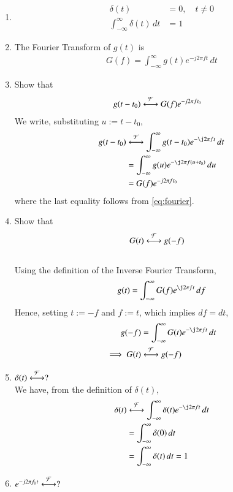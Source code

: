 \documentclass[journal,12pt,twocolumn]{IEEEtran}
\renewcommand\thesection{\arabic{section}}
\begin{document}
\begin{enumerate}[label=\thesection.\arabic*
,ref=\thesection.\theenumi]
\item
\begin{align}
\delta(t)&=0, \quad t\neq0
\\
\int_{-\infty}^{\infty}\delta(t) \, dt&= 1
\end{align}
\item The Fourier Transform of $g(t)$ is
\begin{align}
G(f)=\int_{-\infty}^{\infty}g(t)e^{-j2\pi ft}\,dt
\end{align}
\item Show that
\begin{align}
g(t-t_0)&\overset{\mathcal{F}}{ \longleftrightarrow}G(f)e^{-j2\pi ft_0}
\end{align}
\solution We write, substituting $u := t-t_0$,
\begin{align}
g(t-t_0)&\system{F}\int_{-\infty}^{\infty}
g(t-t_0)e^{-\j2\pi ft}\,dt \\
&=\int_{-\infty}^{\infty}
g(u)e^{-\j2\pi f(u + t_0)}\,du \\
&=G(f)e^{-j2\pi ft_0}
\end{align}
where the last equality follows from \eqref{eq:fourier}.
\item Show that
\begin{align}
G(t)&\overset{\mathcal{F}}{ \longleftrightarrow}g(-f)
\end{align} \\
\solution Using the definition of the Inverse Fourier Transform,
\begin{align}
g(t)=\int_{-\infty}^{\infty}G(f)e^{\j2\pi ft}\,df
\label{eq:duality}
\end{align}
Hence, setting $t := -f$ and $f := t$, which implies $df = dt$,
\begin{align}
g(-f)&=\int_{-\infty}^{\infty}G(t)e^{-\j2\pi ft}\,dt \\
\implies G(t)&\system{F}g(-f)
\end{align}
\item $\delta(t)\overset{\mathcal{F}}{ \longleftrightarrow}?$ \\
\solution We have, from the definition of $\delta(t)$,
\begin{align}
\delta(t)&\system{F}\int_{-\infty}^{\infty}\delta(t)e^{-\j2\pi ft}\, dt \\
&=\int_{-\infty}^{\infty}\delta(0)\, dt \\
&=\int_{-\infty}^{\infty}\delta(t)\, dt = 1
\label{eq:fourier-delta}
\end{align}
\item $e^{-j2\pi f_0t}\overset{\mathcal{F}}{ \longleftrightarrow}?$ \\

\end{enumerate}
\end{document}
